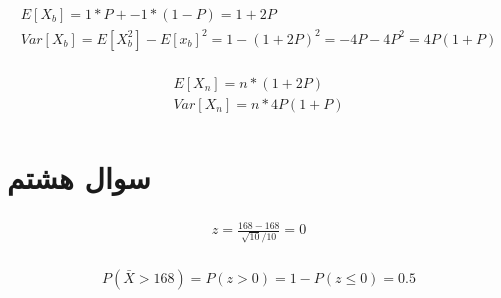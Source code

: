 \documentclass[paper=a4, fontsize=11pt]{article}
\numberwithin{equation}{section} %
\numberwithin{figure}{section} %
\numberwithin{table}{section} %
\begin{document}
\begin{align}
\begin{split}
    E[X_b] = 1 * P + -1 * (1 - P) =  1 + 2P\\
    Var[X_b] = E[X_b^2] - E[x_b]^2 = 1 - (1 + 2P)^2 = -4P - 4P^2 = 4P(1 + P)
\end{split}
\end{align}

\begin{align}
\begin{split}
    E[X_n] = n * (1 + 2P) \\
    Var[X_n] = n * 4P(1 + P)
\end{split}
\end{align}


\section{سوال هشتم}

\begin{align}
\begin{split}
    z = \frac{168 - 168}{\sqrt{10}/10} = 0
\end{split}
\end{align}

\begin{align}
\begin{split}
    P(\bar{X} > 168) = P(z > 0) = 1 - P(z \le 0) = 0.5 
\end{split}
\end{align}
\end{document}
